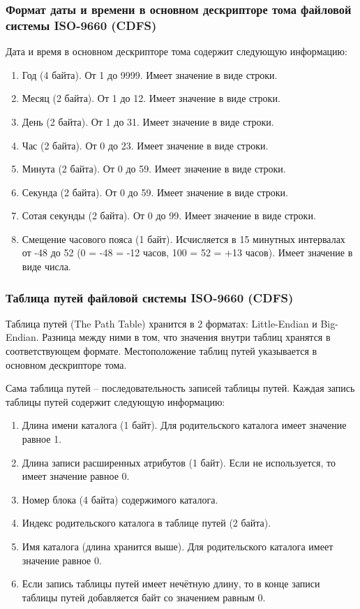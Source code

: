\subsubsection{Формат даты и времени в основном дескрипторе тома файловой системы ISO-9660 (CDFS)}

Дата и время в основном дескрипторе тома содержит следующую информацию:

\begin{enumerate}
	\item Год (4 байта). От 1 до 9999. Имеет значение в виде строки.
	\item Месяц (2 байта). От 1 до 12. Имеет значение в виде строки.
	\item День (2 байта). От 1 до 31. Имеет значение в виде строки.
	\item Час (2 байта). От 0 до 23. Имеет значение в виде строки.
	\item Минута (2 байта). От 0 до 59. Имеет значение в виде строки.
	\item Секунда (2 байта). От 0 до 59. Имеет значение в виде строки.
	\item Сотая секунды (2 байта). От 0 до 99. Имеет значение в виде строки.
	\item Смещение часового пояса (1 байт). Исчисляется в 15 минутных интервалах от -48 до 52 (0 = -48 = -12 часов, 100 = 52 = +13 часов). Имеет значение в виде числа.
\end{enumerate}

\subsubsection{Таблица путей файловой системы ISO-9660 (CDFS)}

Таблица путей (The Path Table) хранится в 2 форматах: Little-Endian и Big-Endian. Разница между ними в том, что значения внутри таблиц хранятся в соответствующем формате. Местоположение таблиц путей указывается в основном дескрипторе тома.

Сама таблица путей -- последовательность записей таблицы путей. Каждая запись таблицы путей содержит следующую информацию:

\begin{enumerate}
\item Длина имени каталога (1 байт). Для родительского каталога имеет значение равное 1.
\item Длина записи расширенных атрибутов (1 байт). Если не используется, то имеет значение равное 0.
\item Номер блока (4 байта) содержимого каталога.
\item Индекс родительского каталога в таблице путей (2 байта).
\item Имя каталога (длина хранится выше). Для родительского каталога имеет значение равное 0. 
\item Если запись таблицы путей имеет нечётную длину, то в конце записи таблицы путей добавляется байт со значением равным 0.
\end{enumerate}

